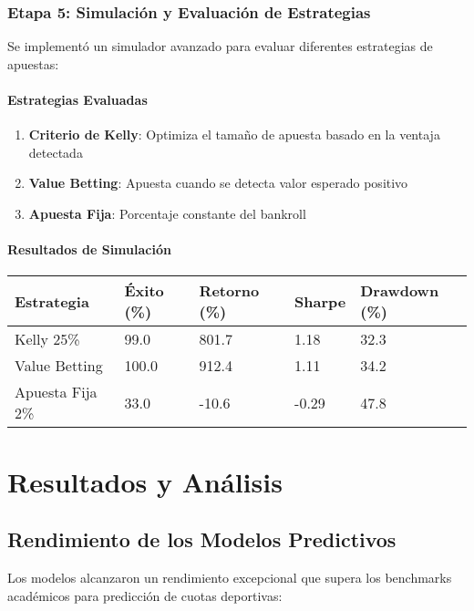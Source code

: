 \documentclass{article}
\begin{document}
\subsubsection{Etapa 5: Simulación y Evaluación de Estrategias}

Se implementó un simulador avanzado para evaluar diferentes estrategias de apuestas:

\paragraph{Estrategias Evaluadas}
\begin{enumerate}
    \item \textbf{Criterio de Kelly}: Optimiza el tamaño de apuesta basado en la ventaja detectada
    \item \textbf{Value Betting}: Apuesta cuando se detecta valor esperado positivo
    \item \textbf{Apuesta Fija}: Porcentaje constante del bankroll
\end{enumerate}

\paragraph{Resultados de Simulación}

\begin{longtable}{|p{3cm}|p{2cm}|p{2cm}|p{2cm}|p{2.5cm}|}
\hline
\textbf{Estrategia} & \textbf{Éxito (\%)} & \textbf{Retorno (\%)} & \textbf{Sharpe} & \textbf{Drawdown (\%)} \\
\hline
\endhead
Kelly 25\% & 99.0 & 801.7 & 1.18 & 32.3 \\
\hline
Value Betting & 100.0 & 912.4 & 1.11 & 34.2 \\
\hline
Apuesta Fija 2\% & 33.0 & -10.6 & -0.29 & 47.8 \\
\hline
\end{longtable}

\section{Resultados y Análisis}

\subsection{Rendimiento de los Modelos Predictivos}

Los modelos alcanzaron un rendimiento excepcional que supera los benchmarks académicos para predicción de cuotas deportivas:
\end{document}
